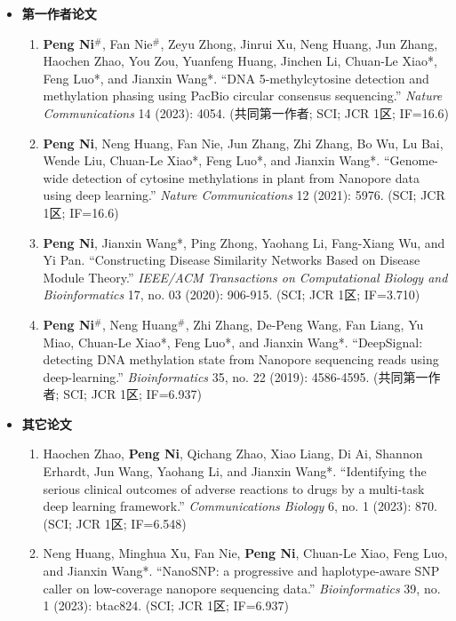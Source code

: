 \documentclass[zh]{resume}
\begin{document}
\begin{itemize}
  \item \textbf{第一作者论文}
  \begin{enumerate}
    \item \textbf{Peng Ni}$^{\#}$, Fan Nie$^{\#}$, Zeyu Zhong, Jinrui Xu, Neng Huang, Jun Zhang, Haochen Zhao, You Zou, Yuanfeng Huang, Jinchen Li, Chuan-Le Xiao*, Feng Luo*, and Jianxin Wang*. \enquote{DNA 5-methylcytosine detection and methylation phasing using PacBio circular consensus sequencing.} {\it Nature Communications} 14 (2023): 4054. (共同第一作者; SCI; JCR 1区; IF=16.6)
    \item \textbf{Peng Ni}, Neng Huang, Fan Nie, Jun Zhang, Zhi Zhang, Bo Wu, Lu Bai, Wende Liu, Chuan-Le Xiao*, Feng Luo*, and Jianxin Wang*. \enquote{Genome-wide detection of cytosine methylations in plant from Nanopore data using deep learning.} {\it Nature Communications} 12 (2021): 5976. (SCI; JCR 1区; IF=16.6)
    \item \textbf{Peng Ni}, Jianxin Wang*, Ping Zhong, Yaohang Li, Fang-Xiang Wu, and Yi Pan. \enquote{Constructing Disease Similarity Networks Based on Disease Module Theory.} {\it IEEE/ACM Transactions on Computational Biology and Bioinformatics} 17, no. 03 (2020): 906-915. (SCI; JCR 1区; IF=3.710)
    \item \textbf{Peng Ni}$^{\#}$, Neng Huang$^{\#}$, Zhi Zhang, De-Peng Wang, Fan Liang, Yu Miao, Chuan-Le Xiao*, Feng Luo*, and Jianxin Wang*. \enquote{DeepSignal: detecting DNA methylation state from Nanopore sequencing reads using deep-learning.} {\it Bioinformatics} 35, no. 22 (2019): 4586-4595. (共同第一作者; SCI; JCR 1区; IF=6.937)
  \end{enumerate}
  \medskip
  \item \textbf{其它论文}
  \begin{enumerate}
    \item Haochen Zhao, \textbf{Peng Ni}, Qichang Zhao, Xiao Liang, Di Ai, Shannon Erhardt, Jun Wang, Yaohang Li, and Jianxin Wang*. \enquote{Identifying the serious clinical outcomes of adverse reactions to drugs by a multi-task deep learning framework.} {\it Communications Biology} 6, no. 1 (2023): 870. (SCI; JCR 1区; IF=6.548)
    \item Neng Huang, Minghua Xu, Fan Nie, \textbf{Peng Ni}, Chuan-Le Xiao, Feng Luo, and Jianxin Wang*. \enquote{NanoSNP: a progressive and haplotype-aware SNP caller on low-coverage nanopore sequencing data.} {\it Bioinformatics} 39, no. 1 (2023): btac824. (SCI; JCR 1区; IF=6.937)

\end{enumerate}
\end{itemize}
\end{document}
